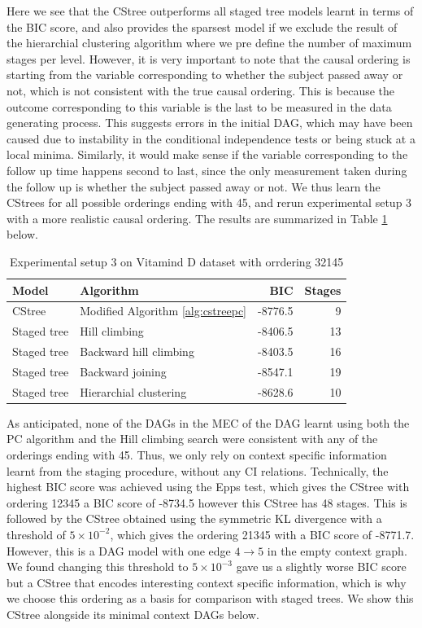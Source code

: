 \documentclass{tufte-book}
\begin{document}
\begin{Definition}
Here we see that the CStree outperforms all staged tree models learnt in terms of the BIC score, and also provides the sparsest model if we exclude the result of the hierarchial clustering algorithm where we pre define the number of maximum stages per level. However, it is very important to note that the causal ordering is starting from the variable corresponding to whether the subject passed away or not, which is not consistent with the true causal ordering. This is because the outcome corresponding to this variable is the last to be measured in the data generating process. This suggests errors in the initial DAG, which may have been caused due to instability in the conditional independence tests or being stuck at a local minima. Similarly, it would make sense if the variable corresponding to the follow up time happens second to last, since the only measurement taken during the follow up is whether the subject passed away or not. We thus learn the CStrees for all possible orderings ending with 45, and rerun experimental setup 3 with a more realistic causal ordering. The results are summarized in Table \ref{tab:org9710f41} below.


\begin{table}[htbp]
\caption{\label{tab:org9710f41}Experimental setup 3 on Vitamind D dataset with orrdering 32145}
\centering
\begin{tabular}{l|l|r|r}
\hline
Model & Algorithm & BIC & Stages\\
\hline
CStree & Modified Algorithm \ref{alg:cstreepc} & -8776.5 & 9\\
Staged tree & Hill climbing & -8406.5 & 13\\
Staged tree & Backward hill climbing & -8403.5 & 16\\
Staged tree & Backward joining & -8547.1 & 19\\
Staged tree & Hierarchial clustering & -8628.6 & 10\\
\end{tabular}
\end{table}

As anticipated, none of the DAGs in the MEC of the DAG learnt using both the PC algorithm and the Hill climbing search were consistent with any of the orderings ending with 45. Thus, we only rely on context specific information learnt from the staging procedure, without any CI relations. Technically, the highest BIC score was achieved using the Epps test, which gives the CStree with ordering 12345 a BIC score of -8734.5 however this CStree has 48 stages. This is followed by the CStree obtained using the symmetric KL divergence with a threshold of \(5 \times 10^{-2}\), which gives the ordering 21345 with a BIC score of -8771.7. However, this is a DAG model with one edge \(4 \rightarrow 5\) in the empty context graph. We found changing this threshold to \(5 \times 10^{-3}\) gave us a slightly worse BIC score but a CStree that encodes interesting context specific information, which is why we choose this ordering as a basis for comparison with staged trees. We show this CStree alongside its minimal context DAGs below.




\end{Definition}
\end{document}
